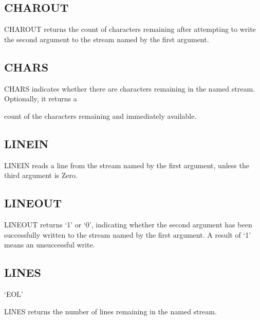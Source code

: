 \subsection{CHAROUT}\label{charout}

CHAROUT returns the count of characters remaining after attempting to
write the second argument to the stream named by the first argument.



\subsection{CHARS}\label{chars}

CHARS indicates whether there are characters remaining in the named
stream. Optionally, it returns a

count of the characters remaining and immediately available.



\subsection{LINEIN}\label{linein}

LINEIN reads a line from the stream named by the first argument, unless
the third argument is Zero.



\subsection{LINEOUT}\label{lineout}

LINEOUT returns `1' or `0', indicating whether the second argument has
been successfully written to the stream named by the first argument. A
result of `1' means an unsuccessful write.



\subsection{LINES}\label{lines}

`EOL'

LINES returns the number of lines remaining in the named stream.

